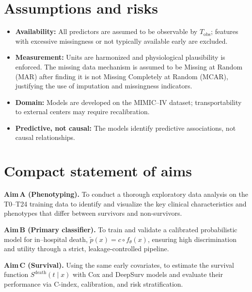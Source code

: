 \section{Assumptions and risks}
\begin{itemize}
  \item \textbf{Availability:} All predictors are assumed to be observable by $T_{\mathrm{obs}}$; features with excessive missingness or not typically available early are excluded.
  \item \textbf{Measurement:} Units are harmonized and physiological plausibility is enforced. The missing data mechanism is assumed to be Missing at Random (MAR) after finding it is not Missing Completely at Random (MCAR), justifying the use of imputation and missingness indicators.
  \item \textbf{Domain:} Models are developed on the MIMIC--IV dataset; transportability to external centers may require recalibration.
  \item \textbf{Predictive, not causal:} The models identify predictive associations, not causal relationships.
\end{itemize}

\section{Compact statement of aims}
\noindent\textbf{Aim\,A (Phenotyping).} To conduct a thorough exploratory data analysis on the T0--T24 training data to identify and visualize the key clinical characteristics and phenotypes that differ between survivors and non-survivors.

\noindent\textbf{Aim\,B (Primary classifier).} To train and validate a calibrated probabilistic model for in–hospital death, $\tilde p(x)=c\circ f_{\theta}(x)$, ensuring high discrimination and utility through a strict, leakage-controlled pipeline.

\noindent\textbf{Aim\,C (Survival).} Using the same early covariates, to estimate the survival function $S^{\mathrm{death}}(t\mid x)$ with Cox and DeepSurv models and evaluate their performance via C-index, calibration, and risk stratification.
